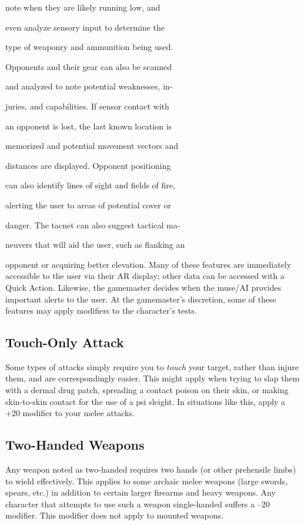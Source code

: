 note when they are likely running low, and 

even analyze sensory input to determine the 

type of weaponry and ammunition being used. 

Opponents and their gear can also be scanned 

and analyzed to note potential weaknesses, in-

juries, and capabilities. If sensor contact with 

an opponent is lost, the last known location is 

memorized and potential movement vectors and 

distances are displayed. Opponent positioning 

can also identify lines of sight and fields of fire, 

alerting the user to areas of potential cover or 

danger. The tacnet can also suggest tactical ma-

neuvers that will aid the user, such as flanking an 

opponent or acquiring better elevation.
Many of these features are immediately accessible 
to the user via their AR display; other data can be accessed
with a Quick Action. Likewise, the gamemaster
decides when the muse/AI provides important alerts to 
the user. At the gamemaster's discretion, some of these 
features may apply modifiers to the character's tests.

\subsection{Touch-Only Attack}

Some types of attacks simply require you to \textit{touch }your 
target, rather than injure them, and are correspondingly
easier. This might apply when trying to slap them
with a dermal drug patch, spreading a contact poison 
on their skin, or making skin-to-skin contact for the 
use of a psi sleight. In situations like this, apply a +20 
modifier to your melee attacks.

\subsection{Two-Handed Weapons}

Any weapon noted as two-handed requires two hands 
(or other prehensile limbs) to wield effectively. This 
applies to some archaic melee weapons (large swords, 
spears, etc.) in addition to certain larger firearms and 
heavy weapons. Any character that attempts to use 
such a weapon single-handed suffers a –20 modifier. 
This modifier does not apply to mounted weapons.

